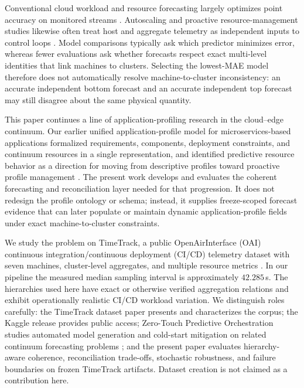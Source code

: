 \documentclass[a4paper,fleqn]{cas-dc}
\begin{document}
Conventional cloud workload and resource forecasting largely optimizes point
accuracy on monitored streams
\cite{calheiros2015workload,masdari2020workload,khan2022workload}.
Autoscaling and proactive resource-management studies likewise often treat host
and aggregate telemetry as independent inputs to control loops
\cite{toka2021kubernetes,casalicchio2019container}.
Model comparisons typically ask which predictor minimizes error, whereas fewer
evaluations ask whether forecasts respect exact multi-level identities that
link machines to clusters.
Selecting the lowest-{MAE} model therefore does not automatically resolve
machine-to-cluster inconsistency: an accurate independent bottom forecast and
an accurate independent top forecast may still disagree about the same physical
quantity.

This paper continues a line of application-profiling research in the
cloud--edge continuum.
Our earlier unified application-profile model for microservices-based
applications formalized requirements, components, deployment constraints, and
continuum resources in a single representation, and identified predictive
resource behavior as a direction for moving from descriptive profiles toward
proactive profile management
\cite{kadouma2025unifiedprofile}.
The present work develops and evaluates the coherent forecasting and
reconciliation layer needed for that progression.
It does not redesign the profile ontology or schema; instead, it supplies
freeze-scoped forecast evidence that can later populate or maintain dynamic
application-profile fields under exact machine-to-cluster constraints.

We study the problem on TimeTrack, a public OpenAirInterface ({OAI}) continuous
integration/continuous deployment ({CI}/{CD}) telemetry dataset with seven
machines, cluster-level aggregates, and multiple resource metrics
\cite{meliani2025timetrack,meliani2025timetrackkaggle}.
In our pipeline the measured median sampling interval is approximately
$42.285$\,s.
The hierarchies used here have exact or otherwise verified aggregation
relations and exhibit operationally realistic {CI}/{CD} workload variation.
We distinguish roles carefully: the TimeTrack dataset paper presents and
characterizes the corpus; the Kaggle release provides public access; Zero-Touch
Predictive Orchestration studies automated model generation and cold-start
mitigation on related continuum forecasting problems
\cite{meliani2026zerotouch};
and the present paper evaluates hierarchy-aware coherence, reconciliation
trade-offs, stochastic robustness, and failure boundaries on frozen TimeTrack
artifacts.
Dataset creation is not claimed as a contribution here.
\end{document}
